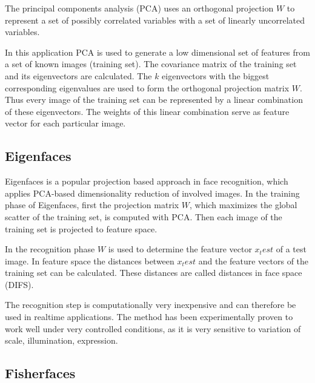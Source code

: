 The principal components analysis (PCA) uses an orthogonal projection $W$ to represent a set of possibly correlated variables with a set of linearly uncorrelated variables.

In this application PCA is used to generate a low dimensional set of features from a set of known images (training set).
The covariance matrix of the training set and its eigenvectors are calculated.
The $k$ eigenvectors with the biggest corresponding eigenvalues are used to form the orthogonal projection matrix $W$.
Thus every image of the training set can be represented by a linear combination of these eigenvectors.
The weights of this linear combination serve as feature vector for each particular image.

\subsection{Eigenfaces}
\todo{}
Eigenfaces is a popular projection based approach in face recognition, which applies PCA-based dimensionality reduction of involved images.
In the training phase of Eigenfaces, first the projection matrix $W$, which maximizes the global scatter of the training set, is computed with PCA.
Then each image of the training set is projected to feature space.

In the recognition phase $W$ is used to determine the feature vector $x_test$ of a test image.
In feature space the distances between $x_test$ and the feature vectors of the training set can be calculated. 
These distances are called distances in face space (DIFS).

The recognition step is computationally very inexpensive and can therefore be used in realtime applications.
The method has been experimentally proven to work well under very controlled conditions, as it is very sensitive to variation of scale, illumination, expression.

\subsection{Fisherfaces}
\todo{}

